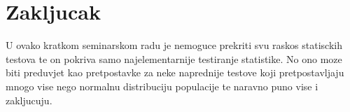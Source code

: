 \chapter{Zakljucak}

U ovako kratkom seminarskom radu je nemoguce prekriti svu raskos statisckih testova te on pokriva samo najelementarnije testiranje statistike.  No ono moze biti preduvjet kao pretpostavke za neke naprednije testove koji pretpostavljaju mnogo vise nego normalnu distribuciju populacije te naravno puno vise i zakljucuju. 